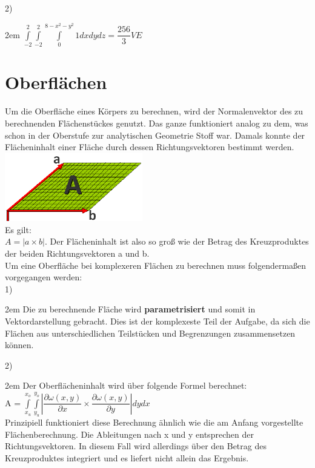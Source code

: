 \documentclass[11pt,final]{scrreprt}
\begin{document}
2)

\begingroup
\leftskip2em 
$ \int\limits_{-2}^{2}\int\limits_{-2}^{2}\int\limits_{0}^{8-x^2-y^2} 1 dxdydz  = \dfrac{256}{3} VE$\\
\par	
\endgroup


\section{Oberflächen}

Um die Oberfläche eines Körpers zu berechnen, wird der Normalenvektor des zu berechnenden Flächenstückes genutzt. Das ganze funktioniert analog zu dem, was schon in der Oberstufe zur analytischen Geometrie Stoff war. Damals konnte der Flächeninhalt einer Fläche durch dessen Richtungsvektoren bestimmt werden.\\
\includegraphics[width=6cm]{images/integrale/volumen2.png}\\
Es gilt:\\
$A = |a\times b|$. Der Flächeninhalt ist also so groß wie der Betrag des Kreuzproduktes der beiden Richtungsvektoren a und b.\\

Um eine Oberfläche bei komplexeren Flächen zu berechnen muss folgendermaßen vorgegangen werden:\\

1)

\begingroup
\leftskip2em 
Die zu berechnende Fläche wird \textbf{parametrisiert} und somit in Vektordarstellung gebracht. Dies ist der komplexeste Teil der Aufgabe, da sich die Flächen aus unterschiedlichen Teilstücken und Begrenzungen zusammensetzen können.\\
\par	
\endgroup

2)

\begingroup
\leftskip2em 
Der Oberflächeninhalt wird über folgende Formel berechnet:\\
A = $\int\limits_{x_u}^{x_o}\int\limits_{y_u}^{y_o}\left| \dfrac{\partial \omega(x, y)}{\partial x}\times \dfrac{\partial \omega(x, y)}{\partial y} \right|dydx$\\
Prinzipiell funktioniert diese Berechnung ähnlich wie die am Anfang vorgestellte Flächenberechnung. Die Ableitungen nach x und y entsprechen der Richtungsvektoren. In diesem Fall wird allerdings über den Betrag des Kreuzproduktes integriert und es liefert nicht allein das Ergebnis.\\
\par	
\endgroup
\end{document}

